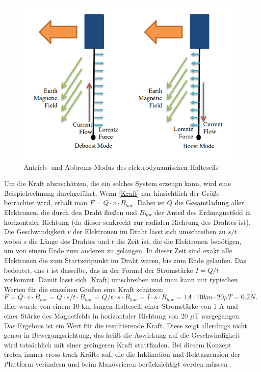 \documentclass{article}
\begin{document}
\begin{figure}[H]
	\centering
	\includegraphics[width=0.6\linewidth]{bilder/EDTBoost.png}
	\caption{Antrieb- und Abbrems-Modus des elektrodynamischen Halteseils \citep{carpenteruse}}
	\label{EDTBoost}
\end{figure}
\noindent Um die Kraft abzuschätzen, die ein solches System erzeugn kann, wird eine Beispielrechnung durchgeführt. Wenn \autoref{Kraft} nur hinsichtlich der Größe betrachtet wird, erhält man $F=Q \cdot v \cdot B_{hor}$. Dabei ist $Q$ die Gesamtladung aller Elektronen, die durch den Draht fließen und $B_{hor}$ der Anteil des Erdmagnetfeld in horizontaler Richtung (da dieser senkrecht zur radialen Richtung des Drahtes ist). Die Geschwindigkeit $v$ der Elektronen im Draht lässt sich umschreiben zu $s/t$ wobei $s$ die Länge des Drahtes und $t$ die Zeit ist, die die Elektronen benötigen, um von einem Ende zum anderen zu gelangen. In dieser Zeit sind exakt alle Elektronen die zum Startzeitpunkt im Draht waren, bis zum Ende gelaufen. Das bedeutet, das $t$ ist dasselbe, das in der Formel der Stromstärke $I=Q/t$ vorkommt. Damit lässt sich \autoref{Kraft} umschreiben und man kann mit typischen Werten für die einzelnen Größen eine Kraft schätzen:
\begin{equation} F = Q \cdot v \cdot B_{hor} = Q \cdot s/t \cdot B_{hor} = Q/t \cdot s \cdot B_{hor} = I \cdot s \cdot B_{hor} = 1 A \cdot 10 km \cdot 20 \mu T = 0.2 N. \end{equation} 
Hier wurde von einem 10 km langen Halteseil, einer Stromstärke von 1 A und einer Stärke des Magnetfelds in horizontaler Richtung von 20 $\mu$T ausgegangen. Das Ergebnis ist ein Wert für die resultierende Kraft. Diese zeigt allerdings nicht genau in Bewegungsrichtung, das heißt die Aswirkung auf die Geschwindigkeit wird tatsächlich mit einer geringeren Kraft stattfinden. Bei diesem Konzept treten immer cross-track-Kräfte auf, die die Inklination und Rektaszension der Plattform verändern und beim Manövrieren berücksichtigt werden müssen \citep{carpenteruse}. \\
\end{document}
